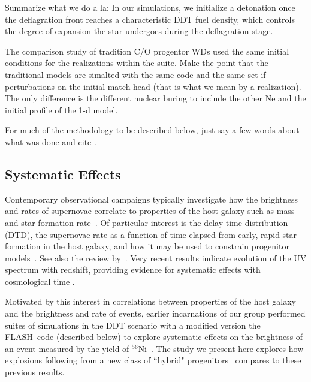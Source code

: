 \documentclass[iop,apj]{emulateapj}
\newcommand{\code}[1]{\textsc{#1}}
\newcommand{\FLASH}{\code{FLASH}}
\begin{document}
Summarize what we do a la:
In our simulations, we initialize a detonation once the 
deflagration front reaches a
characteristic DDT fuel density, which controls the degree of
expansion the star undergoes during the deflagration stage.

The comparison study of tradition C/O progentor WDs used the same
initial conditions for the realizations within the suite. Make the
point that the traditional models are simalted with the same code
and the same set if perturbations on the initial match head (that is
what we mean by a realization). The only difference is the different
nuclear buring to include the other Ne and the initial profile of
the 1-d model.  

For much of the methodology to be described below, just say a few
words about what was done and cite \citet{willcoxetal2016}.

\subsection{Systematic Effects}

Contemporary observational campaigns typically investigate how
the brightness and rates of supernovae correlate to 
properties of the host galaxy such as mass and star formation
rate~\citep[c.f.][]{graurmaoz2013,graurbiancomodjaz2015}. Of
particular interest is the delay time distribution (DTD), the
supernovae rate as a function of time elapsed from 
early, rapid
star formation in the host galaxy, and how it may be used
to constrain progenitor models~\citep{hachisu:2008,
conleyetal2011,howell2011,grauretal2011,biancoetal2011,maozmannuccibrandt2012}.
See also the review by~\citet{maozmannucci2012}.
Very recent results indicate evolution of the UV spectrum with 
redshift, providing evidence for systematic effects with
cosmological time \citep{milneandfoley2015}.

Motivated by this interest in correlations between properties of the
host galaxy and the brightness and rate of events, earlier incarnations of  
our group performed suites of simulations in the DDT scenario
with a modified version the \FLASH\ code (described below) to explore
systematic effects on the brightness of an event measured by the yield of
$^{56}$Ni~\citep{Krueger2010On-Variations-o,jacketal2010,kruegetal12}. The
study we present here explores how explosions following from a new class
of ``hybrid" 
progenitors~\citep{denissenkovetal2013,chenetal2014,denissenkovetal2015} 
compares to these previous results.
\end{document}
